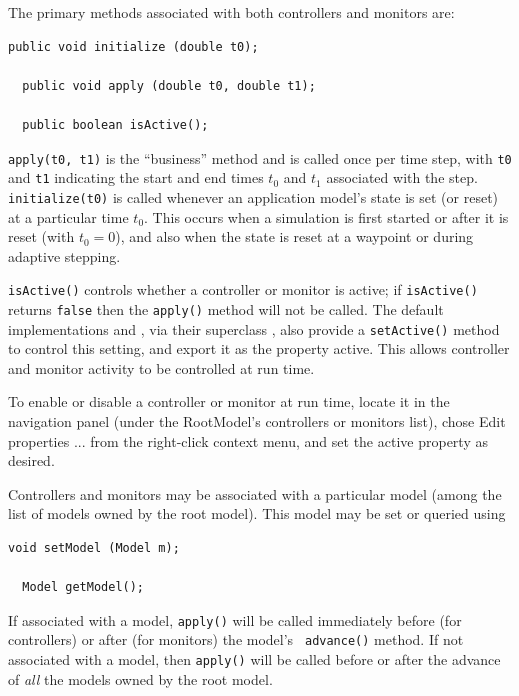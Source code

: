 The primary methods associated with both controllers and
monitors are:
\begin{lstlisting}[]
  public void initialize (double t0);

  public void apply (double t0, double t1);

  public boolean isActive();
\end{lstlisting}
%
{\tt apply(t0, t1)} is the ``business'' method and is called once per
time step, with {\tt t0} and {\tt t1} indicating the start and end
times $t_0$ and $t_1$ associated with the step.  {\tt initialize(t0)}
is called whenever an application model's state is set (or reset) at a
particular time $t_0$. This occurs when a simulation is first started
or after it is reset (with $t_0 = 0$), and also when the state is
reset at a waypoint or during adaptive stepping.

{\tt isActive()} controls whether a controller or monitor is active;
if {\tt isActive()} returns {\tt false} then the {\tt apply()} method
will not be called.
The default implementations
 and
, via their
superclass , also
provide a {\tt setActive()} method to control this setting, and export
it as the property {\sf active}. This allows controller and monitor
activity to be controlled at run time.

\begin{sideblock}
To enable or disable a controller or monitor at run time, locate it in
the navigation panel (under the RootModel's {\sf controllers} or {\sf
monitors} list), chose {\sf Edit properties ...} from the right-click
context menu, and set the {\sf active} property as desired.
\end{sideblock}

Controllers and monitors may be associated with a particular model
(among the list of models owned by the root model). This model may be
set or queried using
\begin{lstlisting}[]
  void setModel (Model m);

  Model getModel();
\end{lstlisting}
%
If associated with a model, {\tt apply()} will be called immediately
before (for controllers) or after (for monitors) the model's {\tt
advance()} method. If not associated with a model, then {\tt apply()}
will be called before or after the advance of {\it all} the models
owned by the root model.

